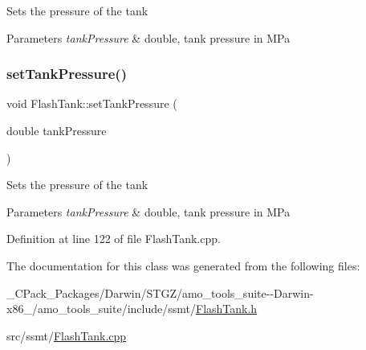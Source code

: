 Sets the pressure of the tank 
\begin{DoxyParams}{Parameters}
{\em tank\+Pressure} & double, tank pressure in M\+Pa \\
\hline
\end{DoxyParams}
\mbox{\label{class_flash_tank_a8b3bb51a62dac4f76284dfdc114d83fe}} 
\subsubsection{\texorpdfstring{set\+Tank\+Pressure()}{setTankPressure()}\hspace{0.1cm}{\footnotesize\ttfamily [3/3]}}
{\footnotesize\ttfamily void Flash\+Tank\+::set\+Tank\+Pressure (\begin{DoxyParamCaption}\item[{double}]{tank\+Pressure }\end{DoxyParamCaption})}

Sets the pressure of the tank 
\begin{DoxyParams}{Parameters}
{\em tank\+Pressure} & double, tank pressure in M\+Pa \\
\hline
\end{DoxyParams}


Definition at line 122 of file Flash\+Tank.\+cpp.



The documentation for this class was generated from the following files\+:\begin{DoxyCompactItemize}
\item 
\+\_\+\+C\+Pack\+\_\+\+Packages/\+Darwin/\+S\+T\+G\+Z/amo\+\_\+tools\+\_\+suite-\/-\/\+Darwin-\/x86\+\_/amo\+\_\+tools\+\_\+suite/include/ssmt/\hyperlink{___c_pack___packages_2_darwin_2_s_t_g_z_2amo__tools__suite--_darwin-x86__64_2amo__tools__suite_2include_2ssmt_2_flash_tank_8h}{Flash\+Tank.\+h}\item 
src/ssmt/\hyperlink{_flash_tank_8cpp}{Flash\+Tank.\+cpp}\end{DoxyCompactItemize}
